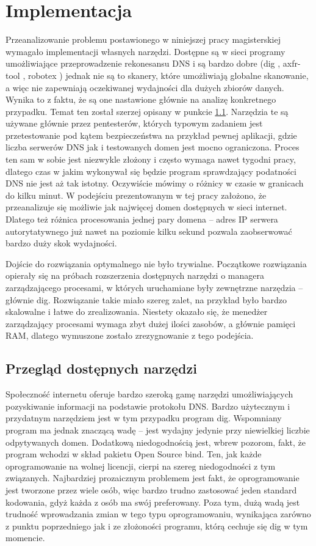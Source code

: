 \chapter{Implementacja}
Przeanalizowanie problemu postawionego w niniejszej pracy magisterskiej wymagało implementacji własnych narzędzi. Dostępne są w sieci
programy umożliwiające przeprowadzenie rekonesansu DNS i są bardzo dobre (dig \cite{dig}, axfr-tool \cite{python_axfr_test}, robotex \cite{robotex})
jednak nie są to skanery, które umożliwiają globalne skanowanie, a więc nie zapewniają oczekiwanej wydajności dla dużych zbiorów
danych. Wynika to z faktu, że są one nastawione głównie na analizę konkretnego przypadku. Temat ten został szerzej opisany w punkcie
\ref{narzedzia}.
Narzędzia te są używane głównie przez pentesterów, których typowym zadaniem jest przetestowanie pod kątem bezpieczeństwa na przykład pewnej
aplikacji, gdzie liczba serwerów DNS jak i testowanych domen jest mocno ograniczona. Proces ten sam w sobie jest niezwykle złożony
i często wymaga nawet tygodni pracy, dlatego czas w jakim wykonywał się będzie program sprawdzający podatności DNS nie jest aż tak
istotny. Oczywiście mówimy o różnicy w czasie w granicach do kilku minut. W podejściu prezentowanym w tej pracy założono, że
przeanalizuje się możliwie jak najwięcej domen dostępnych w sieci internet. Dlatego też różnica procesowania jednej pary
domena -- adres IP serwera autorytatywnego już nawet na poziomie kilku sekund pozwala zaobserwować bardzo duży skok wydajności.

Dojście do rozwiązania optymalnego nie było trywialne. Początkowe rozwiązania opierały się na próbach rozszerzenia dostępnych
narzędzi o managera
zarządzającego procesami, w których uruchamiane były zewnętrzne narzędzia -- głównie dig. Rozwiązanie takie miało szereg zalet,
na przykład było bardzo skalowalne i łatwe do zrealizowania. Niestety okazało się, że menedżer zarządzający procesami wymaga
zbyt dużej ilości zasobów, a głównie pamięci RAM, dlatego wymuszone zostało zrezygnowanie z tego podejścia.

\section{Przegląd dostępnych narzędzi}
\label{narzedzia}
Społeczność internetu oferuje bardzo szeroką gamę narzędzi umożliwiających pozyskiwanie informacji na podstawie protokołu DNS.
Bardzo użytecznym i przydatnym narzędziem jest w tym przypadku program dig. Wspomniany program ma jednak znaczącą wadę -- jest
wydajny jedynie przy niewielkiej liczbie odpytywanych domen. Dodatkową niedogodnością jest, wbrew pozorom, fakt, że program
wchodzi w skład pakietu Open Source bind. Ten, jak każde oprogramowanie na wolnej licencji, cierpi na szereg niedogodności z
tym związanych. Najbardziej prozaicznym problemem jest fakt, że oprogramowanie jest tworzone przez wiele osób, więc bardzo
trudno zastosować jeden standard kodowania, gdyż każda z osób ma swój preferowany. Poza tym, dużą wadą jest trudność wprowadzania
zmian w tego typu oprogramowaniu, wynikająca zarówno z punktu poprzedniego jak i ze złożoności programu, którą cechuje się dig
w tym momencie.

